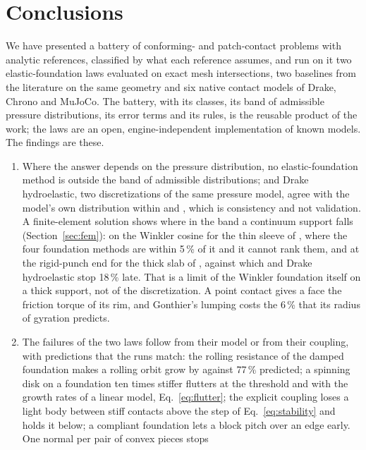 \section{Conclusions}\label{sec:conclusions}

We have presented a battery of  conforming- and patch-contact
problems with analytic references, classified by what each reference assumes, and run on it two
elastic-foundation laws evaluated on exact mesh intersections, two baselines from the
literature on the same geometry and six native contact models of Drake, Chrono and MuJoCo. The
battery, with its classes, its band of admissible pressure distributions, its error terms and
its rules, is the reusable product of the work; the laws are an open, engine-independent
implementation of known models. The findings are these.
\begin{enumerate}
\item Where the answer depends on the pressure distribution, no elastic-foundation method is
  outside the band of admissible distributions;  and Drake hydroelastic, two
  discretizations of the same pressure model, agree with the model's own distribution within
   and , which is consistency and not
  validation. A finite-element solution shows where in the band a continuum support falls
  (Section~\ref{sec:fem}): on the Winkler cosine for the thin sleeve of , where the
  four foundation methods are within 5\,\% of it and it cannot rank them, and at the rigid-punch
  end for the thick slab of , against which  and Drake hydroelastic
  stop 18\,\% late. That is a limit of the Winkler foundation itself on a thick support, not of
  the discretization. A point contact gives a face the friction torque of its rim, and Gonthier's
  lumping costs the 6\,\% that its radius of gyration predicts.
\item The failures of the two laws follow from their model or from their coupling, with
  predictions that the runs match: the rolling resistance of the damped foundation makes a
  rolling orbit grow by  against 77\,\% predicted; a spinning
  disk on a foundation ten times stiffer flutters at the threshold and with the growth rates of
  a linear model, Eq.~\eqref{eq:flutter}; the explicit coupling loses a light body between
  stiff contacts above the step of Eq.~\eqref{eq:stability} and holds it below; a compliant
  foundation lets a block pitch over an edge early. One normal per pair of convex pieces stops

\end{enumerate}

